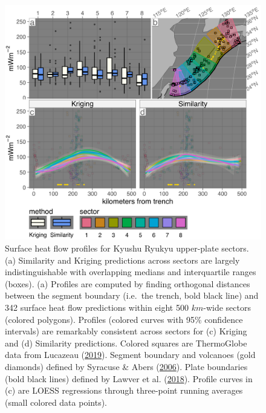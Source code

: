 \begin{figure}[htbp]

{\centering \includegraphics[width=1\linewidth,]{assets/figs/chpt3/kyushuRyukyuUpperPlate} 

}

\caption[Surface heat flow profiles for Kyushu Ryukyu upper-plate sectors]{Surface heat flow profiles for Kyushu Ryukyu upper-plate sectors. (a) Similarity and Kriging predictions across sectors are largely indistinguishable with overlapping medians and interquartile ranges (boxes). (a) Profiles are computed by finding orthogonal distances between the segment boundary (i.e.~the trench, bold black line) and 342 surface heat flow predictions within eight 500 \(km\)-wide sectors (colored polygons). Profiles (colored curves with 95\% confidence intervals) are remarkably consistent across sectors for (c) Kriging and (d) Similarity predictions. Colored squares are ThermoGlobe data from Lucazeau (\protect\hyperlink{ref-lucazeau2019}{2019}). Segment boundary and volcanoes (gold diamonds) defined by Syracuse \& Abers (\protect\hyperlink{ref-syracuse2006}{2006}). Plate boundaries (bold black lines) defined by Lawver et al. (\protect\hyperlink{ref-lawver2018}{2018}). Profile curves in (c) are LOESS regressions through three-point running averages (small colored data points).}\label{fig:kyushuRyukyuUpper}
\end{figure}

